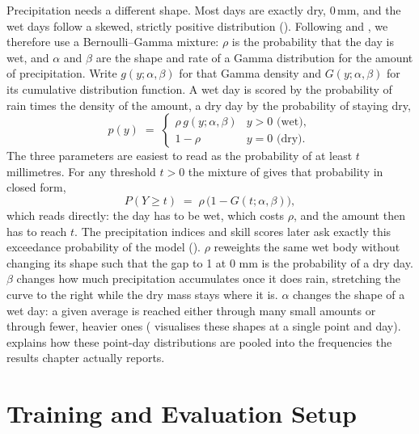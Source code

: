 Precipitation needs a different shape. Most days are exactly dry, $0\,\mathrm{mm}$, and the wet days follow a skewed, strictly positive distribution (). Following \textcite{cannon2008berngamma} and \textcite{vaughan2022convcnp}, we therefore use a Bernoulli--Gamma mixture: $\rho$ is the probability that the day is wet, and $\alpha$ and $\beta$ are the shape and rate of a Gamma distribution for the amount of precipitation. Write $g(y; \alpha, \beta)$ for that Gamma density and $G(y; \alpha, \beta)$ for its cumulative distribution function. A wet day is scored by the probability of rain times the density of the amount, a dry day by the probability of staying dry,
\begin{equation}
    p(y) \;=\;
    \begin{cases}
        \rho \, g(y; \alpha, \beta) & y > 0 \text{ (wet)}, \\
        1 - \rho & y = 0 \text{ (dry)}.
    \end{cases}
\label{eq:bg-density}
\end{equation}
The three parameters are easiest to read as the probability of at least $t$ millimetres. For any threshold $t > 0$ the mixture of  gives that probability in closed form,
\begin{equation}
    P(Y \geq t) \;=\; \rho \, \bigl(1 - G(t; \alpha, \beta)\bigr),
\label{eq:bg-exceedance}
\end{equation}
which reads directly: the day has to be wet, which costs $\rho$, and the amount then has to reach $t$. The precipitation indices and skill scores later ask exactly this exceedance probability of the model (). $\rho$ reweights the same wet body without changing its shape such that the gap to 1 at 0 mm is the probability of a dry day. $\beta$ changes how much precipitation accumulates once it does rain, stretching the curve to the right while the dry mass stays where it is. $\alpha$ changes the shape of a wet day: a given average is reached either through many small amounts or through fewer, heavier ones ( visualises these shapes at a single point and day).  explains how these point-day distributions are pooled into the frequencies the results chapter actually reports.

\section{Training and Evaluation Setup}\label{sec:meth-training}


